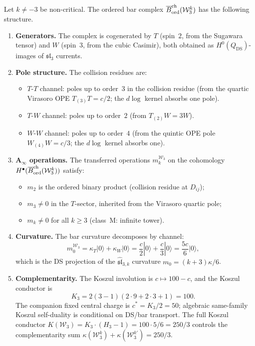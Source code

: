 \begin{theorem}
\label{thm:w3-ordered-bar}
Let $k \neq -3$ be non-critical. The ordered bar complex
$\overline{B}^{\mathrm{ch}}_{\mathrm{ord}}(\mathcal{W}_3^k)$ has the following structure.

\begin{enumerate}[label=\textup{(\roman*)}]
\item \textbf{Generators.} The complex is cogenerated by
 $T$ \textup{(}spin~$2$, from the Sugawara tensor\textup{)} and
 $W$ \textup{(}spin~$3$, from the cubic Casimir\textup{)}, both
 obtained as $H^0(Q_{\mathrm{DS}})$-images of $\mathfrak{sl}_3$
 currents.

\item \textbf{Pole structure.} The collision residues are:
\begin{itemize}
\item $T$-$T$ channel: poles up to order~$3$ in the collision residue
 \textup{(}from the quartic Virasoro OPE $T_{(3)}T = c/2$; the
 $d\log$ kernel absorbs one pole\textup{)}.
\item $T$-$W$ channel: poles up to order~$2$
 \textup{(}from $T_{(2)}W = 3W$\textup{)}.
\item $W$-$W$ channel: poles up to order~$4$
 \textup{(}from the quintic OPE pole
 $W_{(4)}W = c/3$; the $d\log$ kernel absorbs one\textup{)}.
\end{itemize}

\item \textbf{A$_\infty$ operations.} The transferred operations
 $m_k^{\mathcal{W}_3}$ on the cohomology
 $H^\bullet(\overline{B}^{\mathrm{ch}}_{\mathrm{ord}}(\mathcal{W}_3^k))$ satisfy:
 \begin{itemize}
 \item $m_2$ is the ordered binary product
 \textup{(}collision residue at $D_{ij}$\textup{)};
 \item $m_3 \neq 0$ in the $T$-sector, inherited from the Virasoro
 quartic pole;
 \item $m_k \neq 0$ for all $k \geq 3$
 \textup{(}class~$\mathrm{M}$: infinite tower\textup{)}.
 \end{itemize}

\item \textbf{Curvature.} The bar curvature
 decomposes by channel:
 \[
 m_0^{\mathcal{W}_3} = \kappa_T |0\rangle + \kappa_W |0\rangle
 = \frac{c}{2}|0\rangle + \frac{c}{3}|0\rangle
 = \frac{5c}{6}|0\rangle,
 \]
 which is the DS projection of the $\widehat{\mathfrak{sl}}_{3,k}$
 curvature $m_0 = (k{+}3)\kappa/6$.

\item \textbf{Complementarity.}
 The Koszul involution is $c \mapsto 100 - c$,
 and the Koszul conductor is
 \[
 K_3 = 2(3{-}1)(2 \cdot 9 + 2 \cdot 3 + 1) = 100.
 \]
 The companion fixed central charge is $c^* = K_3/2 = 50$; algebraic
 same-family Koszul self-duality is conditional on DS/bar transport.
 The full Koszul conductor
 $K(\mathcal{W}_3) = K_3 \cdot (H_3 - 1) = 100 \cdot 5/6 = 250/3$
 controls the complementarity sum
 $\kappa(\mathcal{W}_3^k) + \kappa(\mathcal{W}_3^{k'}) = 250/3$.
\end{enumerate}
\end{theorem}

